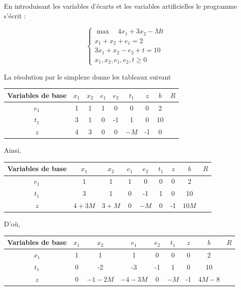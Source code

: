 \documentclass[a4paper,12pt,openany]{book}
\theoremstyle{plain}
\theoremstyle{definition}
\theoremstyle{remark}
\theoremstyle{nbstyle}
\begin{document}
	En introduisant les variables d'écarts et les variables artificielles le programme s'écrit :
	
	$$
	\left\{\begin{array}{c}
	\displaystyle\max \quad 4 x_{1}+3 x_{2}-M t \\
	x_{1}+x_{2}+e_{1}=2 \\
	3 x_{1}+x_{2}-e_{2}+t=10 \\
	x_{1}, x_{2}, e_{1}, e_{2}, t \geq 0
	\end{array}\right.
	$$
	
	La résolution par le simplexe donne les tableaux suivant
	
	\begin{center}
		\begin{tabular}{|c|cccccc|c|c|}
			\hline
			Variables de base & $x_{1}$ & $x_{2}$ & $e_{1}$ & $e_{2}$ & $t_{1}$ & $z$ & $b$ & $R$ \\
			\hline
			$e_{1}$ & 1 & 1 & 1 & 0 & 0 & 0 & 2 &  \\
			$t_{1}$ & 3 & 1 & 0 & -1 & 1 & 0 & 10 &  \\
			\hline
			$z$ & 4 & 3 & 0 & 0 & $-M$ & -1 & 0 &  \\
			\hline
		\end{tabular}
	\end{center}
	
	Ainsi,
	
	\begin{center}
		\begin{tabular}{|c|cccccc|c|c|}
			\hline
			Variables de base & $x_{1}$ & $x_{2}$ & $e_{1}$ & $e_{2}$ & $t_{1}$ & $z$ & $b$ & $R$ \\
			\hline
			$e_{1}$ & 1 & 1 & 1 & 0 & 0 & 0 & 2 &  \\
			$t_{1}$ & 3 & 1 & 0 & -1 & 1 & 0 & 10 &  \\
			\hline
			$z$ & $4+3 M$ & $3+M$ & 0 & $-M$ & 0 & -1 & $10 M$ &  \\
			\hline
		\end{tabular}
	\end{center}
	
	D'où,
	
	\begin{center}
		\begin{tabular}{|c|cccccc|c|c|}
			\hline
			Variables de base & $x_{1}$ & $x_{2}$ & $e_{1}$ & $e_{2}$ & $t_{1}$ & $z$ & $b$ & $R$ \\
			\hline
			$x_{1}$ & 1 & 1 & 1 & 0 & 0 & 0 & 2 &  \\
			$t_{1}$ & 0 & -2 & -3 & -1 & 1 & 0 & 10 &  \\
			\hline
			$z$ & 0 & $-1-2 M$ & $-4-3 M$ & 0 & $-M$ & -1 & $4 M-8$ &  \\
			\hline
		\end{tabular}
	\end{center}
	
\end{document}
